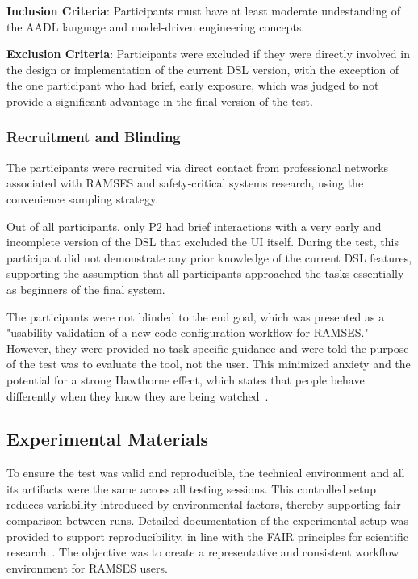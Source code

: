 \textbf{Inclusion Criteria}: Participants must have at least moderate undestanding of the \gls{AADL} language and model-driven engineering concepts.

\textbf{Exclusion Criteria}: Participants were excluded if they were directly involved in the design or implementation of the current \gls{DSL} version, with the exception of the one participant who had brief, early exposure, which was judged to not provide a significant advantage in the final version of the test.

\subsubsection{Recruitment and Blinding}
\label{sec:test_usabl_participant_rec_blind}

The participants were recruited via direct contact from professional networks associated with \gls{RAMSES} and safety-critical systems research, using the convenience sampling strategy.

Out of all participants, only P2 had brief interactions with a very early and incomplete version of the \gls{DSL} that excluded the \gls{UI} itself. During the test, this participant did not demonstrate any prior knowledge of the current \gls{DSL} features, supporting the assumption that all participants approached the tasks essentially as beginners of the final system.

The participants were not blinded to the end goal, which was presented as a "usability validation of a new code configuration workflow for \gls{RAMSES}." However, they were provided no task-specific guidance and were told the purpose of the test was to evaluate the tool, not the user. This minimized anxiety and the potential for a strong Hawthorne effect, which states that people behave differently when they know they are being watched~\cite{McCambridge2014Hawthorne}.


\subsection{Experimental Materials}
\label{sec:test_usabl_materials}

To ensure the test was valid and reproducible, the technical environment and all its artifacts were the same across all testing sessions. This controlled setup reduces variability introduced by environmental factors, thereby supporting fair comparison between runs. Detailed documentation of the experimental setup was provided to support reproducibility, in line with the FAIR principles for scientific research~\cite{fair}. The objective was to create a representative and consistent workflow environment for \gls{RAMSES} users.

